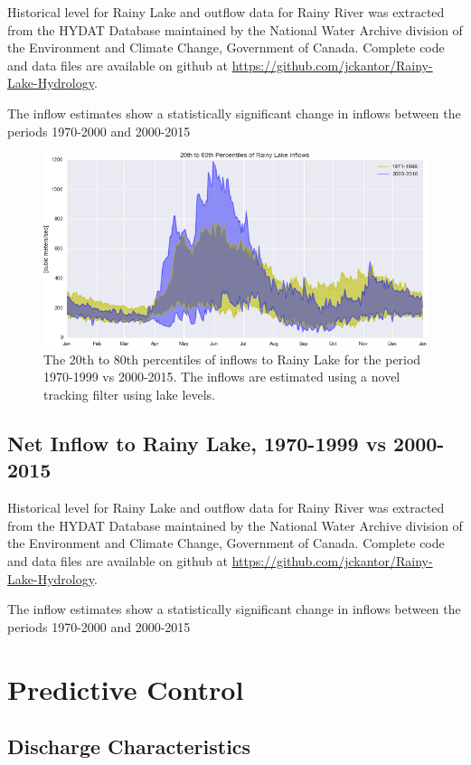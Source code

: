 \documentclass[preprint,times]{elsarticle}
\begin{document}
Historical level for Rainy Lake and outflow data for Rainy River was extracted from the HYDAT Database maintained by the National Water Archive division of the Environment and Climate Change, Government of Canada. Complete code and data files are available on github at \url{https://github.com/jckantor/Rainy-Lake-Hydrology}.

The inflow estimates show a statistically significant change in inflows between the periods 1970-2000 and 2000-2015

\begin{figure}
\includegraphics[width=\linewidth]{RainyLakeInflows}
\caption{The 20th to 80th percentiles of inflows to Rainy Lake for the period 1970-1999 vs 2000-2015. The inflows are estimated using a novel tracking filter using lake levels.}\label{figure:7}
\end{figure}

\subsection{Net Inflow to Rainy Lake, 1970-1999 vs 2000-2015}

Historical level for Rainy Lake and outflow data for Rainy River was extracted from the HYDAT Database maintained by the National Water Archive division of the Environment and Climate Change, Government of Canada. Complete code and data files are available on github at \url{https://github.com/jckantor/Rainy-Lake-Hydrology}.

The inflow estimates show a statistically significant change in inflows between the periods 1970-2000 and 2000-2015

\section{Predictive Control}

\subsection{Discharge Characteristics}
\end{document}

